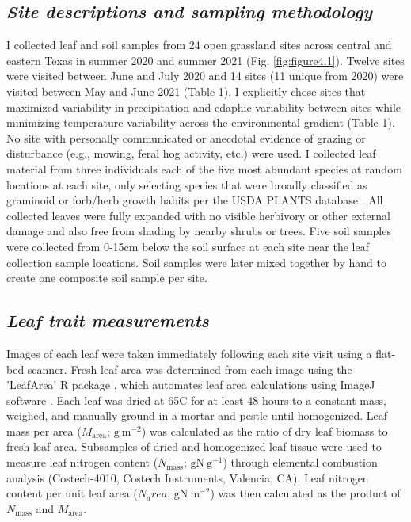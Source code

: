 \subsection{\textit{Site descriptions and sampling methodology}}
I collected leaf and soil samples from 24 open grassland sites across central and eastern Texas in summer 2020 and summer 2021 (Fig. \ref{fig:figure4.1}). Twelve sites were visited between June and July 2020 and 14 sites (11 unique from 2020) were visited between May and June 2021 (Table 1). I explicitly chose sites that maximized variability in precipitation and edaphic variability between sites while minimizing temperature variability across the environmental gradient (Table 1). No site with personally communicated or anecdotal evidence of grazing or disturbance (e.g., mowing, feral hog activity, etc.) were used. I collected leaf material from three individuals each of the five most abundant species at random locations at each site, only  selecting species that were broadly classified as graminoid or forb/herb growth habits per the USDA PLANTS database . All collected leaves were fully expanded with no visible herbivory or other external damage and also free from shading by nearby shrubs or trees. Five soil samples were collected from 0-15cm below the soil surface at each site near the leaf collection sample locations. Soil samples were later mixed together by hand to create one composite soil sample per site.

\subsection{\textit{Leaf trait measurements}}
Images of each leaf were taken immediately following each site visit using a flat-bed scanner. Fresh leaf area was determined from each image using the 'LeafArea' R package , which automates leaf area calculations using ImageJ software . Each leaf was dried at 65\textdegree{}C for at least 48 hours to a constant mass, weighed, and manually ground in a mortar and pestle until homogenized. Leaf mass per area ($M_\mathrm{area}$; $\mathrm{g\ m^{-2}}$) was calculated as the ratio of dry leaf biomass to fresh leaf area. Subsamples of dried and homogenized leaf tissue were used to measure leaf nitrogen content ($N_\mathrm{mass}$; $\mathrm{gN\ g^{-1}}$) through elemental combustion analysis (Costech-4010, Costech Instruments, Valencia, CA). Leaf nitrogen content per unit leaf area ($N_area$; $\mathrm{gN\ m^{-2}}$) was then calculated as the product of $N_\mathrm{mass}$ and $M_\mathrm{area}$.
    
